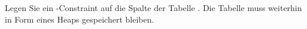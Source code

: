 \item Legen Sie ein \UNIQUE-Constraint auf die Spalte  der
Tabelle . Die Tabelle muss weiterhin in Form eines Heaps
gespeichert bleiben.
